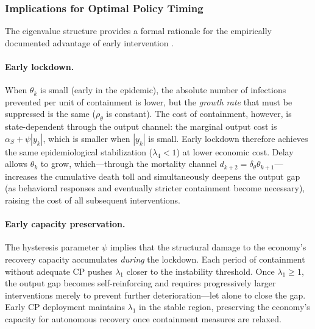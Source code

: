 \documentclass[12pt, a4paper]{article}
\begin{document}
\subsubsection{Implications for Optimal Policy Timing}

The eigenvalue structure provides a formal rationale for the empirically documented
advantage of early intervention
\citep{balmford2020,acemoglu2021}.

\paragraph{Early lockdown.} When $\theta_k$ is small (early in the epidemic), the
absolute number of infections prevented per unit of containment is lower, but the
\textit{growth rate} that must be suppressed is the same ($\rho_\theta$ is constant).
The cost of containment, however, is state-dependent through the output channel: the
marginal output cost is $\alpha_S + \psi |y_k|$, which is smaller when $|y_k|$ is small.
Early lockdown therefore achieves the same epidemiological stabilization ($\lambda_4 < 1$)
at lower economic cost. Delay allows $\theta_k$ to grow, which---through the mortality
channel $d_{k+2} = \delta_\theta \theta_{k+1}$---increases the cumulative death toll and
simultaneously deepens the output gap (as behavioral responses and eventually stricter
containment become necessary), raising the cost of all subsequent interventions.

\paragraph{Early capacity preservation.} The hysteresis parameter $\psi$ implies that
the structural damage to the economy's recovery capacity accumulates \textit{during} the
lockdown. Each period of containment without adequate CP pushes $\lambda_1$ closer to
the instability threshold. Once $\lambda_1 \geq 1$, the output gap becomes
self-reinforcing and requires progressively larger interventions merely to prevent
further deterioration---let alone to close the gap. Early CP deployment maintains
$\lambda_1$ in the stable region, preserving the economy's capacity for autonomous
recovery once containment measures are relaxed.
\end{document}
